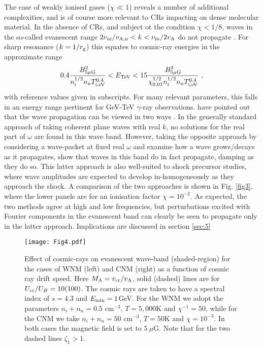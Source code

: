 \documentclass[a4paper,fleqn,usenatbib]{mnras}
\newcommand{\eqb}{\begin{eqnarray}}
\newcommand{\eqe}{\end{eqnarray}}
\begin{document}
The case of weakly ionised gases ($\chi \ll 1$) reveals a number of additional complexities, and is of course more relevant to CRs impacting on dense molecular material. In the absence of CRs, and subject ot the condition $\chi < 1/8$, waves in the so-called evanescent range $2 \nu_{\rm ni}/v_{\rm A,n} < k < \nu_{\rm in}/2 v_{\rm A}$ do not propagate \citep{ZweibelShull}.
For sharp resonance ($k=1/r_{\rm g}$) this equates to cosmic-ray energies in the approximate range
\eqb
\label{EvRange}
0.4 \frac{ B_{5\mu {\rm G}}^2}{ n_{\rm i}^{1/2} n_{\rm n} T_{\rm i,eV}^{0.4}}
 < E_{\rm TeV} <
 15 \frac{ B_{5\mu {\rm G}}^2}{\chi_{0.01}^{1/2} n_{\rm i}^{1/2} n_{\rm n} T_{\rm i,eV}^{0.4} }~,
\eqe 
with reference values given in subscripts. For many relevant parameters, this falls in an energy range pertinent for GeV-TeV $\gamma$-ray observations. 
\cite{Tagger95} have pointed out that the wave propagation can be viewed in two ways \cite[see also][]{Soler}. In the generally standard approach of taking coherent plane waves with real $k$, no solutions for the real part of $\omega$ are found in this wave band. However, taking the opposite approach by considering a wave-packet at fixed real $\omega$ and examine how a wave grows/decays as it propagates, \cite{Tagger95} show that waves in this band do in fact propagate, damping as they do so. This latter approach is also well-suited to shock precursor studies, where wave amplitudes are expected to develop in-homogeneously as they approach the shock.
A comparison of the two approaches is shown in Fig. \ref{fig3}, where the lower panels are for an ionisation factor $\chi=10^{-2}$. As expected, the two methods agree at high and low frequencies, but perturbations excited with Fourier components in the evanescent band can clearly be seen to propagate only in the latter approach. Implications are discussed in section \ref{sec:5}




    \begin{figure*}
    	
    	\begin{center}
    	\texttt{[image: Fig4.pdf]} 
    	\end{center}
    	
    	\caption{ Effect of cosmic-rays on evanescent wave-band (shaded-region) for the cases of WNM (left) and CNM (right) as a function of cosmic ray drift speed. Here $M_{\rm A}=v_{\rm cr}/v_{\rm A}$, solid (dashed) lines are for $U_{\rm cr}/U_B =10 (100)$. The cosmic rays are taken to have a spectral index of $s=4.3$ and $E_{\rm min}=1$GeV. 
    	For the WNM we adopt the parameters $n_i+n_n=0.5$ cm$^{-3}$, $T=5,000$K and $\chi^{-1}=50$, while for the 
       CNM we take $n_i+n_n=50$ cm$^{-3}$, $T=50$K and $\chi=10^{-3}$. 
    In both cases the magnetic field is set to $5~\mu$G. Note that for the two dashed lines $\zeta_1>1$. }
    	\label{fig4}
    \end{figure*} 
\end{document}
